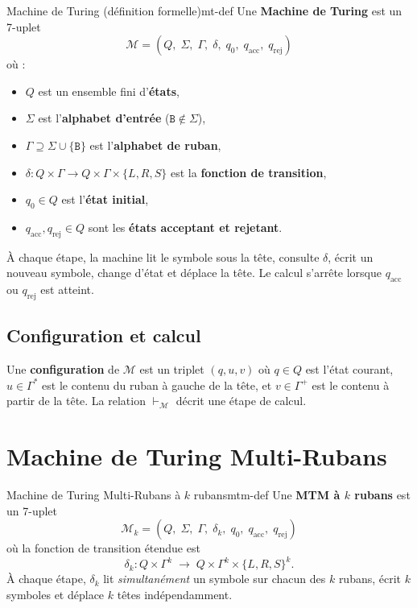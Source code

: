 \documentclass[12pt, a4paper, oneside]{report}
\newcommand{\B}{\texttt{B}}  %
\newcommand{\mtm}{\mathcal{M}}
\begin{document}
\begin{defn}{Machine de Turing (définition formelle)}{mt-def}
  Une \textbf{Machine de Turing} est un 7-uplet
  \[
    \mtm = (Q,\; \Sigma,\; \Gamma,\; \delta,\; q_0,\; q_{\text{acc}},\; q_{\text{rej}})
  \]
  où :
  \begin{itemize}[nosep]
    \item $Q$ est un ensemble fini d'\textbf{états},
    \item $\Sigma$ est l'\textbf{alphabet d'entrée} ($\B \notin \Sigma$),
    \item $\Gamma \supseteq \Sigma \cup \{\B\}$ est l'\textbf{alphabet de ruban},
    \item $\delta : Q \times \Gamma \to Q \times \Gamma \times \{L, R, S\}$ est la \textbf{fonction de transition},
    \item $q_0 \in Q$ est l'\textbf{état initial},
    \item $q_{\text{acc}}, q_{\text{rej}} \in Q$ sont les \textbf{états acceptant et rejetant}.
  \end{itemize}
\end{defn}

À chaque étape, la machine lit le symbole sous la tête, consulte $\delta$, écrit un nouveau symbole, change d'état et déplace la tête. Le calcul s'arrête lorsque $q_{\text{acc}}$ ou $q_{\text{rej}}$ est atteint.

\subsection{Configuration et calcul}

Une \textbf{configuration} de $\mtm$ est un triplet $(q, u, v)$ où $q \in Q$ est l'état courant, $u \in \Gamma^*$ est le contenu du ruban à gauche de la tête, et $v \in \Gamma^+$ est le contenu à partir de la tête. La relation $\vdash_{\mtm}$ décrit une étape de calcul.

\section{Machine de Turing Multi-Rubans}

\begin{defn}{Machine de Turing Multi-Rubans à $k$ rubans}{mtm-def}
  Une \textbf{MTM à $k$ rubans} est un 7-uplet
  \[
    \mtm_k = (Q,\; \Sigma,\; \Gamma,\; \delta_k,\; q_0,\; q_{\text{acc}},\; q_{\text{rej}})
  \]
  où la fonction de transition étendue est
  \[
    \delta_k : Q \times \Gamma^k \;\longrightarrow\; Q \times \Gamma^k \times \{L, R, S\}^k.
  \]
  À chaque étape, $\delta_k$ lit \emph{simultanément} un symbole sur chacun des $k$ rubans, écrit $k$ symboles et déplace $k$ têtes indépendamment.
\end{defn}
\end{document}
